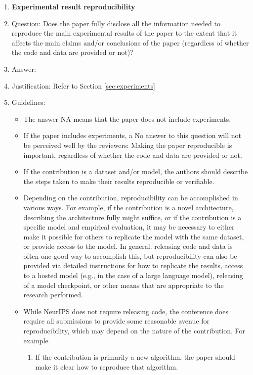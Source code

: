 \documentclass{article}
\begin{document}
\begin{enumerate}
    \item {\bf Experimental result reproducibility}
    \item[] Question: Does the paper fully disclose all the information needed to reproduce the main experimental results of the paper to the extent that it affects the main claims and/or conclusions of the paper (regardless of whether the code and data are provided or not)?
    \item[] Answer: \answerYes{} %
    \item[] Justification: Refer to Section \ref{sec:experiments}
    \item[] Guidelines:
    \begin{itemize}
        \item The answer NA means that the paper does not include experiments.
        \item If the paper includes experiments, a No answer to this question will not be perceived well by the reviewers: Making the paper reproducible is important, regardless of whether the code and data are provided or not.
        \item If the contribution is a dataset and/or model, the authors should describe the steps taken to make their results reproducible or verifiable. 
        \item Depending on the contribution, reproducibility can be accomplished in various ways. For example, if the contribution is a novel architecture, describing the architecture fully might suffice, or if the contribution is a specific model and empirical evaluation, it may be necessary to either make it possible for others to replicate the model with the same dataset, or provide access to the model. In general. releasing code and data is often one good way to accomplish this, but reproducibility can also be provided via detailed instructions for how to replicate the results, access to a hosted model (e.g., in the case of a large language model), releasing of a model checkpoint, or other means that are appropriate to the research performed.
        \item While NeurIPS does not require releasing code, the conference does require all submissions to provide some reasonable avenue for reproducibility, which may depend on the nature of the contribution. For example
        \begin{enumerate}
            \item If the contribution is primarily a new algorithm, the paper should make it clear how to reproduce that algorithm.

\end{enumerate}
\end{itemize}
\end{enumerate}
\end{document}
